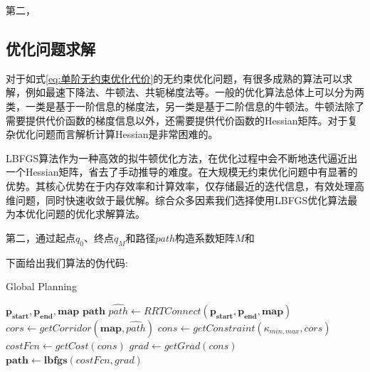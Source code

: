 \documentclass[master,academic]{ysuthesis} %
\begin{document}
		第二，

		\subsection{优化问题求解}
		对于如式\ref{eq:单阶无约束优化代价}的无约束优化问题，有很多成熟的算法可以求解，例如最速下降法、牛顿法、共轭梯度法等。一般的优化算法总体上可以分为两类，一类是基于一阶信息的梯度法，另一类是基于二阶信息的牛顿法。牛顿法除了需要提供代价函数的梯度信息以外，还需要提供代价函数的Hessian矩阵。对于复杂优化问题而言解析计算Hessian是非常困难的。
		
		LBFGS算法作为一种高效的拟牛顿优化方法，在优化过程中会不断地迭代逼近出一个Hessian矩阵，省去了手动推导的难度。在大规模无约束优化问题中有显著的优势。其核心优势在于内存效率和计算效率，仅存储最近的迭代信息，有效处理高维问题，同时快速收敛于最优解。综合众多因素我们选择使用LBFGS优化算法最为本优化问题的优化求解算法。


		第二，通过起点$q_0$、终点$q_M$和路径$path$构造系数矩阵$M$和
		
		下面给出我们算法的伪代码:
		 \begin{algorithm}[H]  
		 	\caption{Global Planning}  
		 	\label{Planning}  
		 	\begin{algorithmic}[1]  
		 		\REQUIRE  
		 		$\mathbf{p_{start}},\mathbf{p_{end}},\mathbf{map}$
		 		\ENSURE  
		 		$\mathbf{path}$
		 		\STATE $\hat{path} \leftarrow RRTConnect(\mathbf{p_{start}},\mathbf{p_{end}},\mathbf{map})$
		 		\STATE $cors \leftarrow getCorridor(\mathbf{map},\hat{path})$
		 		\STATE $cons \leftarrow getConstraint(\kappa_{min,max},cors)$
		 		\STATE $costFcn \leftarrow getCost(cons)$
		 		\STATE $grad \leftarrow getGrad(cons)$ \\
		 		\RETURN $\mathbf{path} \leftarrow \mathbf{lbfgs}(costFcn,grad)$
		 	\end{algorithmic}  
		 \end{algorithm}
		
\end{document}
